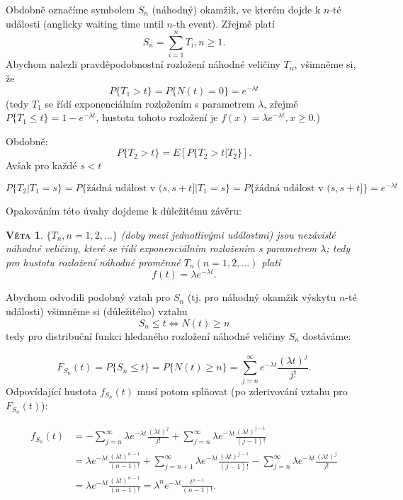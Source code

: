 \documentclass[10pt]{article}
\newtheorem{proposition}{\textsc{Věta}}
\begin{document}
Obdobně označíme symbolem $S_n$ (náhodný) okamžik, ve kterém dojde k $n$-té události (anglicky waiting time until $n$-th event). Zřejmě platí $$S_n = \sum_{i=1}^{n} T_i, n \geq 1.$$ Abychom nalezli pravděpodobnostní rozložení náhodné veličiny $T_n$, všimněme si, že $$P\{T_1>t\} = P\{N(t)=0\}= e^{- \lambda t}$$ (tedy $T_1$ se řídí exponenciálním rozložením s parametrem $\lambda$, zřejmě $P\{T_1 \leq t \} = 1- e^{- \lambda t}$, hustota tohoto rozložení je $f(x) = \lambda e^{- \lambda t}, x \geq 0.$)

Obdobně: $$P\{T_2 > t\} = E[P\{T_2 > t|T_2\}].$$ Avšak pro každé $s<t$

$$P\{T_2|T_1=s\} = P\{\text{žádná událost v }(s,s+t]|T_1=s\}= P\{\text{žádná událost v }(s,s+t]\} = e^{-\lambda t}$$

Opakováním této úvahy dojdeme k důležitému závěru:

\begin{proposition}
$\{T_n, n=1,2,...\}$ (doby mezi jednotlivými událostmi) jsou nezávislé náhodné veličiny, které se řídí exponenciálním rozložením s parametrem $\lambda$; tedy pro hustotu rozložení náhodné proměnné $T_n (n=1,2,...)$ platí \begin{equation} f(t) = \lambda e^{-\lambda t}. \end{equation}
\end{proposition}

Abychom odvodili podobný vztah pro $S_n$ (tj. pro náhodný okamžik výskytu $n$-té události) všimněme si (důležitého) vztahu $$S_n \leq t \Leftrightarrow N(t) \geq n$$ tedy pro distribuční funkci hledaného rozložení náhodné veličiny $S_n$ dostáváme:

$$F_{S_n} (t) = P\{S_n \leq t\} = P\{N(t) \geq n\} = \sum_{j=n}^{\infty} e^{-\lambda t} \frac{(\lambda t)^j}{j!}.$$ Odpovídající hustota $f_{S_n} (t)$ musí potom splňovat (po zderivování vztahu pro $F_{S_n} (t)$):

\begin{equation*}
\begin{split}
f_{S_n} (t) 	&= - \sum_{j=n}^{\infty} \lambda e^{-\lambda t} \frac{(\lambda t)^j}{j!} + \sum_{j=n}^{\infty} \lambda e^{-\lambda t} \frac{(\lambda t)^{j-1}}{(j-1)!}\\
			&=  \lambda e^{-\lambda t} \frac{(\lambda t)^{n-1}}{(n-1)!} + \sum_{j=n+1}^{\infty} \lambda e^{-\lambda t} \frac{(\lambda t)^{j-1}}{(j-1)!} - \sum_{j=n}^{\infty} \lambda e^{-\lambda t} \frac{(\lambda t)^j}{j!}\\
			&=\lambda e^{-\lambda t} \frac{(\lambda t)^{n-1}}{(n-1)!} = \lambda^n e^{-\lambda t} \frac{t^{n-1}}{(n-1)!}.
\end{split}
\end{equation*}
\end{document}
